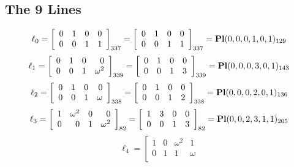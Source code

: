 \documentclass{article}
\begin{document}
{\subsection*{The 9 Lines}
$$
\ell_{0} = 
\left[
\begin{array}{*{4}{r}}
0 & 1 & 0 & 0\\
0 & 0 & 1 & 1\\
\end{array}
\right]
_{337}
=
\left[
\begin{array}{*{4}c}
0  & 1  & 0  & 0\\
0  & 0  & 1  & 1\\
\end{array}
\right]_{337}
={\rm\bf Pl}(0,0,0,1,0,1 )_{129}$$
$$
\ell_{1} = 
\left[
\begin{array}{*{4}{r}}
0 & 1 & 0 & 0\\
0 & 0 & 1 & \omega^{2}\\
\end{array}
\right]
_{339}
=
\left[
\begin{array}{*{4}c}
0  & 1  & 0  & 0\\
0  & 0  & 1  & 3\\
\end{array}
\right]_{339}
={\rm\bf Pl}(0,0,0,3,0,1 )_{143}$$
$$
\ell_{2} = 
\left[
\begin{array}{*{4}{r}}
0 & 1 & 0 & 0\\
0 & 0 & 1 & \omega \\
\end{array}
\right]
_{338}
=
\left[
\begin{array}{*{4}c}
0  & 1  & 0  & 0\\
0  & 0  & 1  & 2\\
\end{array}
\right]_{338}
={\rm\bf Pl}(0,0,0,2,0,1 )_{136}$$
$$
\ell_{3} = 
\left[
\begin{array}{*{4}{r}}
1 & \omega^{2} & 0 & 0\\
0 & 0 & 1 & \omega^{2}\\
\end{array}
\right]
_{82}
=
\left[
\begin{array}{*{4}c}
1  & 3  & 0  & 0\\
0  & 0  & 1  & 3\\
\end{array}
\right]_{82}
={\rm\bf Pl}(0,0,2,3,1,1 )_{205}$$
$$
\ell_{4} = 
\left[
\begin{array}{*{4}{r}}
1 & 0 & \omega^{2} & 1\\
0 & 1 & 1 & \omega \\

\end{array}$$}
\end{document}
